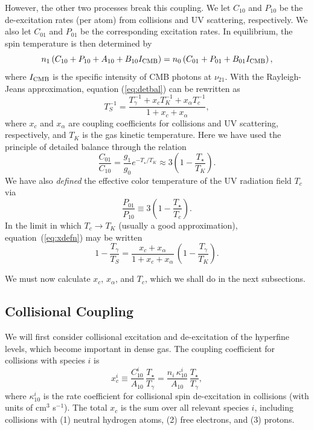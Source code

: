 However, the other two processes break this coupling. We let $C_{10}$ and $P_{10}$ be the de-excitation rates (per atom) from collisions and UV scattering, respectively.  We also let $C_{01}$ and $P_{01}$ be the
corresponding excitation rates.  In equilibrium, the spin temperature is then
determined by
\begin{equation}
n_1 \left( C_{10} + P_{10} + A_{10} + B_{10} I_{\rm CMB} \right) = n_0 \left( C_{01} + P_{01} + B_{01} I_{\rm CMB} \right),
\label{eq:detbal}
\end{equation}
where $I_{\rm CMB}$ is the specific intensity of CMB photons at $\nu_{21}$.  With the Rayleigh-Jeans approximation, equation (\ref{eq:detbal}) can be rewritten as
\begin{equation}
T_S^{-1} = \frac{T_\gamma^{-1} + x_c T_K^{-1} + x_\alpha T_c^{-1}}{1 + x_c + x_\alpha},
\label{eq:xdefn}
\end{equation}
where $x_c$ and $x_\alpha$ are coupling coefficients for collisions and UV scattering, respectively, and $T_K$ is the gas kinetic temperature.  Here we have used the principle of detailed balance through the relation
\begin{equation}
\frac{C_{01}}{C_{10}} = \frac{g_1}{g_0} e^{-T_\star/T_K} \approx 3 \left( 1 - \frac{T_\star}{T_K} \right).
\label{eq:c01db}
\end{equation}
We have also \emph{defined} the effective color temperature of the UV radiation field $T_c$ via
\begin{equation}
\frac{P_{01}}{P_{10}} \equiv 3 \left( 1 - \frac{T_\star}{T_c} \right).
\label{eq:tcolor}
\end{equation}
In the limit in which $T_c \rightarrow T_K$ (usually a good approximation), equation~(\ref{eq:xdefn}) may be written 
\begin{equation}
1 - \frac{T_\gamma}{T_S} = \frac{x_c + x_\alpha}{1 + x_c + x_\alpha} \, \left( 1 - \frac{T_\gamma}{T_K} \right).
\label{eq:xdefn-tfac}
\end{equation}

We must now calculate $x_c$,  $x_\alpha$, and $T_c$, which we shall do in the next subsections.

\subsection{Collisional Coupling} \label{coll}

We will first consider collisional excitation and de-excitation of the hyperfine levels, which become important in dense gas.  The coupling coefficient for collisions with species $i$ is
\begin{equation}
x_c^i \equiv  \frac{C_{10}^i}{A_{10}} \, \frac{T_\star}{T_\gamma} = \frac{n_i \, \kappa_{10}^i}{A_{10}} \, \frac{T_\star}{T_\gamma},
\label{eq:xcdefn}
\end{equation}
where $\kappa_{10}^i$ is the rate coefficient for collisional spin de-excitation in collisions (with units of cm$^3$ s$^{-1}$).  The total $x_c$ is the sum over all relevant species $i$, including collisions with (1) neutral hydrogen atoms, (2) free electrons, and (3) protons.  

